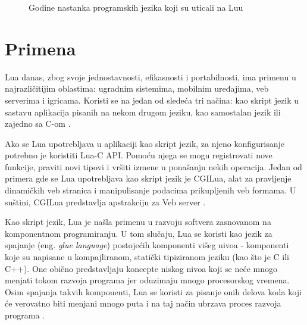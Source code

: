 \documentclass[a4paper]{article}
\begin{document}

\begin{figure}
\caption{Godine nastanka programskih jezika koji su uticali na Luu}
\label{fig:godine}
\end{figure}

\section{Primena}	
\label{sec:primena}


Lua danas, zbog svoje jednostavnosti, efikasnosti i portabilnosti, ima primenu u najrazličitijim oblastima: ugradnim sistemima, mobilnim  uređajima, veb serverima i igricama. Koristi se na jedan od sledeća tri načina: kao skript jezik u sastavu aplikacija pisanih na nekom drugom jeziku, kao samostalan jezik ili zajedno sa C-om \cite{bookProgInLua}.

Ako se Lua upotrebljava u aplikaciji kao skript jezik, za njeno konfigurisanje potrebno je koristiti Lua-C API. Pomoću njega se mogu registrovati nove funkcije, praviti novi tipovi i vršiti izmene u ponašanju nekih operacija. Jedan od primera gde se Lua upotrebljava kao skript jezik je CGILua, alat za pravljenje dinamičkih veb stranica i manipulisanje podacima prikupljenih veb formama. U suštini, CGILua predstavlja apstrakciju za Veb server \cite{keplerProject}.

Kao skript jezik, Lua je našla primenu u razvoju softvera zasnovanom na komponentnom programiranju. U tom slučaju, Lua se koristi kao jezik za spajanje (eng. \textit{glue language}) postojećih komponenti višeg nivoa - komponenti koje su napisane u kompajliranom, statički tipiziranom jeziku (kao što je C ili C++). One obično predstavljaju koncepte niskog nivoa koji se neće mnogo menjati tokom razvoja programa jer oduzimaju mnogo procesorskog vremena. Osim spajanja takvih komponenti, Lua se koristi za pisanje onih delova koda koji će verovatno biti menjani mnogo puta i na taj način ubrzava proces razvoja programa \cite{bookProgInLua}.
\end{document}
